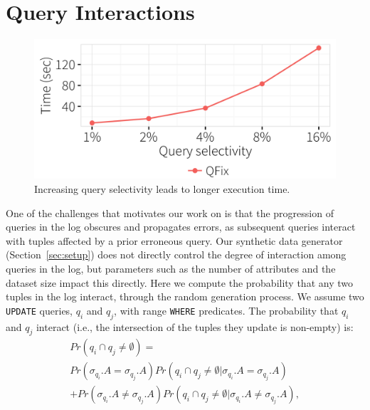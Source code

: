 \section{Query Interactions} \label{app:selectivity}

\begin{figure}[t]
\centering
  \includegraphics[width =.66\columnwidth]{figures/rangevstime}
 \caption{ Increasing query selectivity leads to longer \sys execution time.}
  \label{f:selectivityvstime} 
\end{figure}

One of the challenges that motivates our work on \sys is that the progression
of queries in the log obscures and propagates errors, as subsequent queries
interact with tuples affected by a prior erroneous query. Our synthetic data
generator (Section~\ref{sec:setup}) does not directly control the degree of
interaction among queries in the log, but parameters such as the number of
attributes and the dataset size impact this directly. Here we compute the
probability that any two tuples in the log interact, through the random
generation process. We assume two \texttt{UPDATE} queries, $q_i$ and $q_j$,
with range \texttt{WHERE} predicates.  The probability that $q_i$ and $q_j$ interact (i.e., the intersection of the tuples they update is non-empty) is:
\begin{multline*}
Pr(q_i\cap q_j \neq \emptyset) =\\ 
Pr(\sigma_{q_i}.A= \sigma_{q_j}.A)Pr(q_i\cap q_j \neq \emptyset |\sigma_{q_i}.A= \sigma_{q_j}.A) \\
+ Pr(\sigma_{q_i}.A\neq \sigma_{q_j}.A)Pr(q_i\cap q_j \neq \emptyset |\sigma_{q_i}.A\neq \sigma_{q_j}.A), 
\end{multline*}



